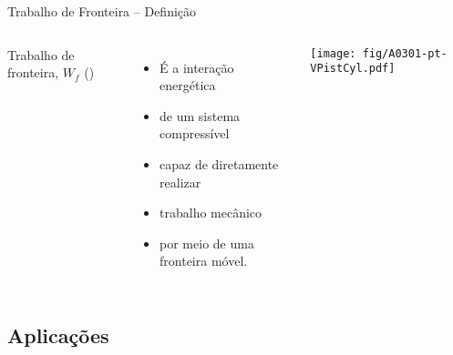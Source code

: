     \begin{frame}{Trabalho de Fronteira -- Definição}\vspace*{-2em}
        \begin{columns}
        Trabalho de fronteira, $W_f$ (\kilo\joule)                          \\[\medskipamount]
        \begin{itemize}
            \item É a \alert{interação  energética}                         \\[\medskipamount]
            \item de um \alert{sistema compressível}                        \\[\medskipamount]
            \item capaz de \alert{diretamente} realizar                     \\[\medskipamount]
            \item \alert{trabalho mecânico}                                 \\[\medskipamount]
            \item por meio de uma \alert{fronteira móvel}.
        \end{itemize}
        \texttt{[image: fig/A0301-pt-VPistCyl.pdf]}
        \end{columns}
    \end{frame}

\subsection{Aplicações}

